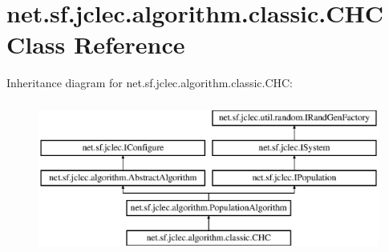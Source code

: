 \hypertarget{classnet_1_1sf_1_1jclec_1_1algorithm_1_1classic_1_1_c_h_c}{\section{net.\-sf.\-jclec.\-algorithm.\-classic.\-C\-H\-C Class Reference}
\label{classnet_1_1sf_1_1jclec_1_1algorithm_1_1classic_1_1_c_h_c}
}
Inheritance diagram for net.\-sf.\-jclec.\-algorithm.\-classic.\-C\-H\-C\-:\begin{figure}[H]
\begin{center}
\leavevmode
\includegraphics[height=5.000000cm]{classnet_1_1sf_1_1jclec_1_1algorithm_1_1classic_1_1_c_h_c}
\end{center}
\end{figure}
